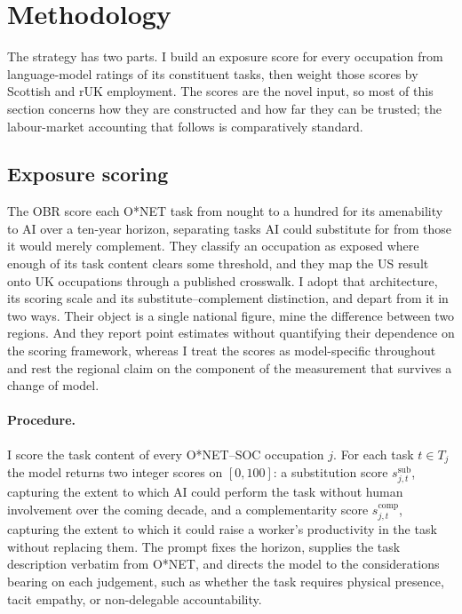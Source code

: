 \section{Methodology}\label{sec:method}


The strategy has two parts. I build an exposure score for every occupation from language-model ratings of its constituent tasks, then weight those scores by Scottish and rUK employment. The scores are the novel input, so most of this section concerns how they are constructed and how far they can be trusted; the labour-market accounting that follows is comparatively standard.

\subsection{Exposure scoring}\label{sec:scoring}

The OBR score each O*NET task from nought to a hundred for its amenability to AI over a ten-year horizon, separating tasks AI could substitute for from those it would merely complement. They classify an occupation as exposed where enough of its task content clears some threshold, and they map the US result onto UK occupations through a published crosswalk. I adopt that architecture, its scoring scale and its substitute--complement distinction, and depart from it in two ways. Their object is a single national figure, mine the difference between two regions. And they report point estimates without quantifying their dependence on the scoring framework, whereas I treat the scores as model-specific throughout and rest the regional claim on the component of the measurement that survives a change of model.

\paragraph{Procedure.} I score the task content of every O*NET--SOC occupation $j$. For each task $t \in T_j$ the model returns two integer scores on $[0,100]$: a substitution score $s^{\mathrm{sub}}_{j,t}$, capturing the extent to which AI could perform the task without human involvement over the coming decade, and a complementarity score $s^{\mathrm{comp}}_{j,t}$, capturing the extent to which it could raise a worker's productivity in the task without replacing them. The prompt fixes the horizon, supplies the task description verbatim from O*NET, and directs the model to the considerations bearing on each judgement, such as whether the task requires physical presence, tacit empathy, or non-delegable accountability.

